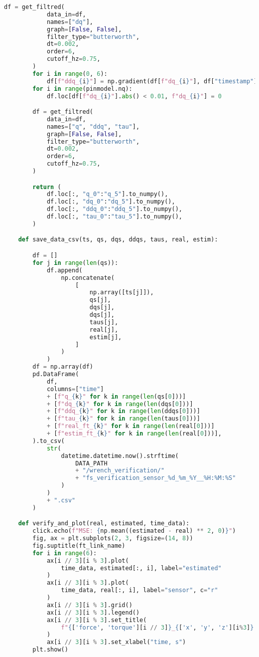 \begin{lstlisting}[language=python, caption=\raggedright{verification/fs\_verification.py}, frame=single]
        df = get_filtred(
            data_in=df,
            names=["dq"],
            graph=[False, False],
            filter_type="butterworth",
            dt=0.002,
            order=6,
            cutoff_hz=0.75,
        )
        for i in range(0, 6):
            df[f"ddq_{i}"] = np.gradient(df[f"dq_{i}"], df["timestamp"])
        for i in range(pinmodel.nq):
            df.loc[df[f"dq_{i}"].abs() < 0.01, f"dq_{i}"] = 0

        df = get_filtred(
            data_in=df,
            names=["q", "ddq", "tau"],
            graph=[False, False],
            filter_type="butterworth",
            dt=0.002,
            order=6,
            cutoff_hz=0.75,
        )

        return (
            df.loc[:, "q_0":"q_5"].to_numpy(),
            df.loc[:, "dq_0":"dq_5"].to_numpy(),
            df.loc[:, "ddq_0":"ddq_5"].to_numpy(),
            df.loc[:, "tau_0":"tau_5"].to_numpy(),
        )

    def save_data_csv(ts, qs, dqs, ddqs, taus, real, estim):

        df = []
        for j in range(len(qs)):
            df.append(
                np.concatenate(
                    [
                        np.array([ts[j]]),
                        qs[j],
                        dqs[j],
                        dqs[j],
                        taus[j],
                        real[j],
                        estim[j],
                    ]
                )
            )
        df = np.array(df)
        pd.DataFrame(
            df,
            columns=["time"]
            + [f"q_{k}" for k in range(len(qs[0]))]
            + [f"dq_{k}" for k in range(len(dqs[0]))]
            + [f"ddq_{k}" for k in range(len(ddqs[0]))]
            + [f"tau_{k}" for k in range(len(taus[0]))]
            + [f"real_ft_{k}" for k in range(len(real[0]))]
            + [f"estim_ft_{k}" for k in range(len(real[0]))],
        ).to_csv(
            str(
                datetime.datetime.now().strftime(
                    DATA_PATH
                    + "/wrench_verification/"
                    + "fs_verification_sensor_%d_%m_%Y__%H:%M:%S"
                )
            )
            + ".csv"
        )

    def verify_and_plot(real, estimated, time_data):
        click.echo(f"MSE: {np.mean((estimated - real) ** 2, 0)}")
        fig, ax = plt.subplots(2, 3, figsize=(14, 8))
        fig.suptitle(ft_link_name)
        for i in range(6):
            ax[i // 3][i % 3].plot(
                time_data, estimated[:, i], label="estimated"
            )
            ax[i // 3][i % 3].plot(
                time_data, real[:, i], label="sensor", c="r"
            )
            ax[i // 3][i % 3].grid()
            ax[i // 3][i % 3].legend()
            ax[i // 3][i % 3].set_title(
                f"{['force', 'torque'][i // 3]}_{['x', 'y', 'z'][i%3]} [{['N', 'Nm'][i // 3]}]"
            )
            ax[i // 3][i % 3].set_xlabel("time, s")
        plt.show()


\end{lstlisting}
